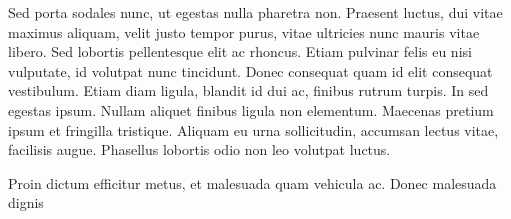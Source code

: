 \documentclass[12pt,a4paper]{article}
\begin{document}
Sed porta sodales nunc, ut egestas nulla pharetra non. Praesent luctus, dui vitae maximus aliquam, velit justo tempor purus, vitae ultricies nunc mauris vitae libero. Sed lobortis pellentesque elit ac rhoncus. Etiam pulvinar felis eu nisi vulputate, id volutpat nunc tincidunt. Donec consequat quam id elit consequat vestibulum. Etiam diam ligula, blandit id dui ac, finibus rutrum turpis. In sed egestas ipsum. Nullam aliquet finibus ligula non elementum. Maecenas pretium ipsum et fringilla tristique. Aliquam eu urna sollicitudin, accumsan lectus vitae, facilisis augue. Phasellus lobortis odio non leo volutpat luctus.

Proin dictum efficitur metus, et malesuada quam vehicula ac. Donec malesuada dignis
\end{document}
